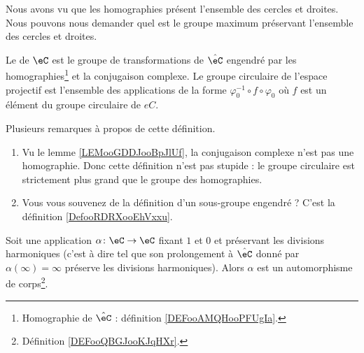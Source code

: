 Nous avons vu que les homographies présent l'ensemble des cercles et droites. Nous pouvons nous demander quel est le groupe maximum préservant l'ensemble des cercles et droites.

\begin{definition}
    Le  de \( \eC\) est le groupe de transformations de \( \hat \eC  \) engendré par les homographies\footnote{Homographie de \( \hat\eC\) : définition \ref{DEFooAMQHooPFUgIa}.} et la conjugaison complexe. Le groupe circulaire de l'espace projectif est l'ensemble des applications de la forme \( \varphi_0^{-1}\circ f\circ\varphi_0\) où \( f\) est un élément du groupe circulaire de \( eC\).
\end{definition}

Plusieurs remarques à propos de cette définition.
\begin{enumerate}
    \item
        Vu le lemme \ref{LEMooGDDJooBpJlUf}, la conjugaison complexe n'est pas une homographie. Donc cette définition n'est pas stupide : le groupe circulaire est strictement plus grand que le groupe des homographies.
    \item
        Vous vous souvenez de la définition d'un sous-groupe engendré ? C'est la définition \ref{DefooRDRXooEhVxxu}.
\end{enumerate}

\begin{lemma}       \label{LEMooOPOMooWZLSeH}
    Soit une application \( \alpha\colon \eC\to \eC\) fixant \( 1\) et \( 0\) et préservant les divisions harmoniques (c'est à dire tel que son prolongement à \( \hat\eC\) donné par \( \alpha(\infty)=\infty\) préserve les divisions harmoniques). Alors \( \alpha\) est un automorphisme de corps\footnote{Définition \ref{DEFooQBGJooKJqHXr}.}.
\end{lemma}

